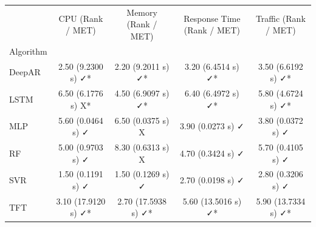 \begin{tabular}{lcccc}
\toprule
{} &     CPU (Rank / MET) &  Memory (Rank / MET) & Response Time (Rank / MET) & Traffic (Rank / MET) \\
Algorithm &                      &                      &                            &                      \\
\midrule
DeepAR    &   2.50 (9.2300 s) ✓* &   2.20 (9.2011 s) ✓* &         3.20 (6.4514 s) ✓* &   3.50 (6.6192 s) ✓* \\
LSTM      &   6.50 (6.1776 s) X* &   4.50 (6.9097 s) ✓* &         6.40 (6.4972 s) ✓* &   5.80 (4.6724 s) ✓* \\
MLP       &    5.60 (0.0464 s) ✓ &    6.50 (0.0375 s) X &          3.90 (0.0273 s) ✓ &    3.80 (0.0372 s) ✓ \\
RF        &    5.00 (0.9703 s) ✓ &    8.30 (0.6313 s) X &          4.70 (0.3424 s) ✓ &    5.70 (0.4105 s) ✓ \\
SVR       &    1.50 (0.1191 s) ✓ &    1.50 (0.1269 s) ✓ &          2.70 (0.0198 s) ✓ &    2.80 (0.3206 s) ✓ \\
TFT       &  3.10 (17.9120 s) ✓* &  2.70 (17.5938 s) ✓* &        5.60 (13.5016 s) ✓* &  5.90 (13.7334 s) ✓* \\
\bottomrule
\end{tabular}

